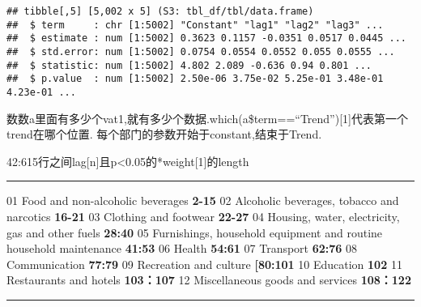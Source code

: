 \documentclass[
]{article}
\newenvironment{Shaded}{\begin{snugshade}}{\end{snugshade}}
\newcommand{\CommentTok}[1]{\textcolor[rgb]{0.56,0.35,0.01}{\textit{#1}}}
\newcommand{\ControlFlowTok}[1]{\textcolor[rgb]{0.13,0.29,0.53}{\textbf{#1}}}
\newcommand{\DecValTok}[1]{\textcolor[rgb]{0.00,0.00,0.81}{#1}}
\newcommand{\FunctionTok}[1]{\textcolor[rgb]{0.00,0.00,0.00}{#1}}
\newcommand{\NormalTok}[1]{#1}
\newcommand{\OtherTok}[1]{\textcolor[rgb]{0.56,0.35,0.01}{#1}}
\newcommand{\SpecialCharTok}[1]{\textcolor[rgb]{0.00,0.00,0.00}{#1}}
\newcommand{\StringTok}[1]{\textcolor[rgb]{0.31,0.60,0.02}{#1}}
\begin{document}
\begin{verbatim}
## tibble[,5] [5,002 x 5] (S3: tbl_df/tbl/data.frame)
##  $ term     : chr [1:5002] "Constant" "lag1" "lag2" "lag3" ...
##  $ estimate : num [1:5002] 0.3623 0.1157 -0.0351 0.0517 0.0445 ...
##  $ std.error: num [1:5002] 0.0754 0.0554 0.0552 0.055 0.0555 ...
##  $ statistic: num [1:5002] 4.802 2.089 -0.636 0.94 0.801 ...
##  $ p.value  : num [1:5002] 2.50e-06 3.75e-02 5.25e-01 3.48e-01 4.23e-01 ...
\end{verbatim}

数数a里面有多少个vat1,就有多少个数据.which(a\$term==``Trend''){[}1{]}代表第一个trend在哪个位置.
每个部门的参数开始于constant,结束于Trend.

42:615行之间lag{[}n{]}且p\textless0.05的*weight{[}1{]}的length

\begin{center}\rule{0.5\linewidth}{0.5pt}\end{center}

01 Food and non-alcoholic beverages \textbf{2-15} 02 Alcoholic
beverages, tobacco and narcotics \textbf{16-21} 03 Clothing and footwear
\textbf{22-27} 04 Housing, water, electricity, gas and other fuels
\textbf{28:40 } 05 Furnishings, household equipment and routine
household maintenance \textbf{41:53 } 06 Health \textbf{54:61 } 07
Transport \textbf{62:76 } 08 Communication \textbf{77:79 } 09 Recreation
and culture \textbf{{[}80:101} 10 Education \textbf{102} 11 Restaurants
and hotels \textbf{103：107} 12 Miscellaneous goods and services
\textbf{108：122}

\begin{center}\rule{0.5\linewidth}{0.5pt}\end{center}

\begin{Shaded}
\end{Shaded}
\end{document}
